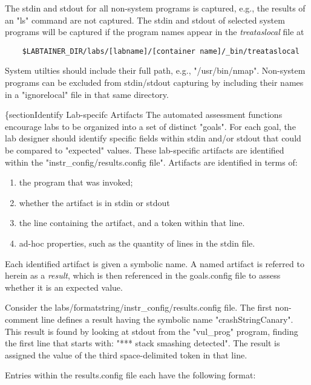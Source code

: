 \documentclass[12pt]{article}
\begin{document}
The stdin and stdout for all non-system programs is captured, e.g., the results of an "ls" command
are not captured.  The stdin and stdout of selected system programs will be captured if the program
names appear in the \textit{treataslocal} file at
\begin{verbatim}
    $LABTAINER_DIR/labs/[labname]/[container name]/_bin/treataslocal
\end{verbatim}
\noindent System utilties should include their full path, e.g., "/usr/bin/nmap".
Non-system programs can be excluded from stdin/stdout capturing by including their names in
a "ignorelocal" file in that same directory.

\{section{Identify Lab-specifc Artifacts}
The automated assessment functions encourage labs to be organized into a set of distinct "goals".
For each goal, the lab designer should identify specific fields within stdin and/or stdout that
could be compared to "expected" values.  These lab-specific artifacts are identified within the
"instr\_config/results.config file".  Artifacts are identified in terms of:
\begin{enumerate}
\item the program that was invoked;
\item whether the artifact is in stdin or stdout
\item the line containing the artifact, and a token within that line.
\item ad-hoc properties, such as the quantity of lines in the stdin file.
\end{enumerate}

Each identified artifact is given a symbolic name. A named artifact is referred to herein as a \textit{result}, which 
is then referenced in the goals.config file to assess whether it is an expected value.

Consider the labs/formatstring/instr\_config/results.config file.  The first non-comment line
defines a result having the symbolic name "crashStringCanary".  This result is
found by looking at stdout from the "vul\_prog" program, finding the first line that starts with:
"*** stack smashing detected".  The result is assigned the value of the third space-delimited 
token in that line.

Entries within the results.config file each have the following format:
\end{document}
